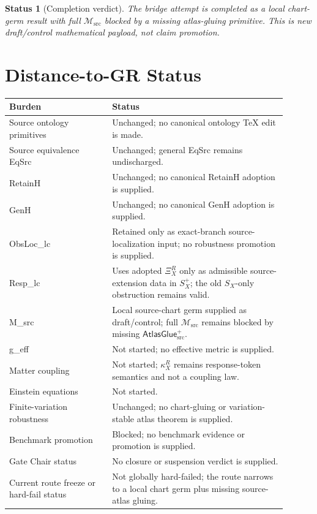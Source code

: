 \documentclass[11pt]{article}
\newcommand{\Msrc}{\mathcal{M}_{\mathrm{src}}}
\newcommand{\XiR}{\Xi_X^R}
\newcommand{\SX}{S_X}
\newcommand{\Splus}{S_X^+}
\newcommand{\AtlasGlue}{\mathsf{AtlasGlue}_{\mathrm{src}}^{+}}
\newtheorem{status}{Status}
\begin{document}
\begin{status}[Completion verdict]
The bridge attempt is completed as a local chart-germ result with
full \(\Msrc\) blocked by a missing atlas-gluing primitive. This is
new draft/control mathematical payload, not claim promotion.
\end{status}

\section{Distance-to-GR Status}

\begin{center}
\begin{tabular}{p{0.33\linewidth}p{0.57\linewidth}}
\hline
Burden & Status \\
\hline
Source ontology primitives & Unchanged; no canonical ontology TeX edit is made. \\
Source equivalence EqSrc & Unchanged; general EqSrc remains undischarged. \\
RetainH & Unchanged; no canonical RetainH adoption is supplied. \\
GenH & Unchanged; no canonical GenH adoption is supplied. \\
ObsLoc\_lc & Retained only as exact-branch source-localization input; no robustness promotion is supplied. \\
Resp\_lc & Uses adopted \(\XiR\) only as admissible source-extension data in \(\Splus\); the old \(\SX\)-only obstruction remains valid. \\
M\_src & Local source-chart germ supplied as draft/control; full \(\Msrc\) remains blocked by missing \(\AtlasGlue\). \\
g\_eff & Not started; no effective metric is supplied. \\
Matter coupling & Not started; \(\kappa_X^R\) remains response-token semantics and not a coupling law. \\
Einstein equations & Not started. \\
Finite-variation robustness & Unchanged; no chart-gluing or variation-stable atlas theorem is supplied. \\
Benchmark promotion & Blocked; no benchmark evidence or promotion is supplied. \\
Gate Chair status & No closure or suspension verdict is supplied. \\
Current route freeze or hard-fail status & Not globally hard-failed; the route narrows to a local chart germ plus missing source-atlas gluing. \\
\hline
\end{tabular}
\end{center}
\end{document}
